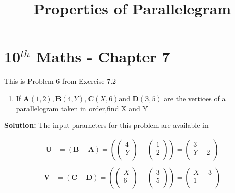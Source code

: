 \documentclass[12pt]{article}
\providecommand{\brak}[1]{\ensuremath{\left(#1\right)}}
\newcommand{\solution}{\noindent \textbf{Solution: }}
\newcommand{\myvec}[1]{\ensuremath{\begin{pmatrix}#1\end{pmatrix}}}
\let\vec\mathbf
\begin{document}
\begin{center}
\title{\textbf{Properties of Parallelegram}}
\date{\vspace{-5ex}} %
\maketitle
\end{center}

\setcounter{page}{1}

\section{10$^{th}$ Maths - Chapter 7}

This is Problem-6 from Exercise 7.2

\begin{enumerate}
\item If $\vec{A}(1, 2),\vec{B}(4, Y),\vec{C}(X, 6) \text{and } \vec{D}(3, 5)$ are the vertices of a parallelogram taken in order,find X and Y
\end{enumerate}

\solution The input parameters for this problem are available in
\begin{center}
\begin{table}[ht!]
	
\caption{}
\label{table}	
\end{table}
\end{center}
\begin{align}
  \label{eq:det2f}
  \vec{U} &=\brak{\vec{B}-\vec{A}} = \brak{\myvec{
  4 \\
  Y \\
 } - \myvec{
  1 \\
  2 \\
 } 
 } = \myvec{
 3 \\
 Y-2 \\
 }   \\
 \end{align}
 \begin{align}
   \vec{V} &= \brak{\vec{C}-\vec{D}} = \brak{\myvec{
  X \\
  6 \\
 } - \myvec{
  3 \\
  5 \\
 } 
 } = \myvec{
 X-3 \\
 1 \\
 }   \\
 \end{align}
  
\end{document}
